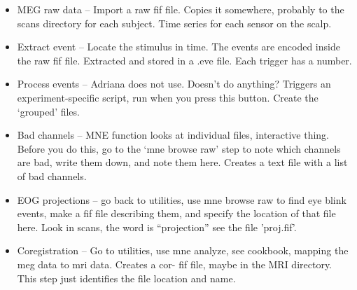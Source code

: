 \documentclass[11pt]{article}
\begin{document}
\begin{itemize}

\item MEG raw data -- Import a raw fif file.  Copies it somewhere,
  probably to the scans directory for each subject.  Time series for
  each sensor on the scalp.

\item Extract event -- Locate the stimulus in time.  The events are
  encoded inside the raw fif file.  Extracted and stored in a .eve
  file.  Each trigger has a number.

\item Process events -- Adriana does not use.  Doesn't do anything?
  Triggers an experiment-specific script, run when you press this
  button.  Create the `grouped' files.

\item Bad channels -- MNE function looks at individual files,
  interactive thing.  Before you do this, go to the `mne browse raw' step
  to note which channels are bad, write them down, and note them
  here.  Creates a text file with a list of bad channels.

\item EOG projections -- go back to utilities, use mne browse raw to
  find eye blink events, make a fif file describing them, and specify
  the location of that file here.  Look in scans, the word is
  ``projection''  see the file 'proj.fif'.

\item Coregistration -- Go to utilities, use mne analyze, see
  cookbook, mapping the meg data to mri data.  Creates a cor- fif
  file, maybe in the MRI directory.  This step just identifies the
  file location and name.

\end{itemize}
\end{document}
